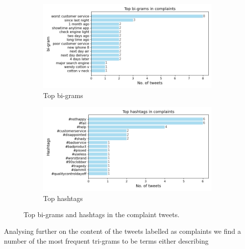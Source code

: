 \begin{figure}[htbp]
    \centering
    \captionsetup{font=small}
    \begin{subfigure}{0.49\textwidth}
        \centering
        \includegraphics[width=\linewidth]{figures/top_trigram_horiz_bar.png}
        \caption{Top bi-grams}
        \label{fig: domain_dist_pct}
    \end{subfigure}
    \hfill
    \begin{subfigure}{0.49\textwidth}
        \centering
        \includegraphics[width=\linewidth]{figures/top_hash_horiz_bar.png}
        \caption{Top hashtags}
        \label{fig: domain_dist_count}
    \end{subfigure}
    \caption{Top bi-grams and hashtags in the complaint tweets.}
    \label{fig: compl_main_dist}
\end{figure}

Analysing further on the content of the tweets labelled as complaints we find a number of the most frequent tri-grams to be terms either describing 


